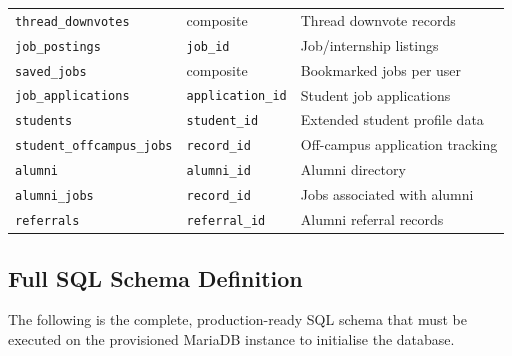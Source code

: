 \documentclass[12pt,a4paper]{article}
\begin{document}
\begin{center}
\begin{tabular}{llp{7cm}}
    \texttt{thread\_downvotes}    & composite               & Thread downvote records \\
    \texttt{job\_postings}        & \texttt{job\_id}         & Job/internship listings \\
    \texttt{saved\_jobs}          & composite               & Bookmarked jobs per user \\
    \texttt{job\_applications}    & \texttt{application\_id} & Student job applications \\
    \texttt{students}             & \texttt{student\_id}     & Extended student profile data \\
    \texttt{student\_offcampus\_jobs} & \texttt{record\_id}  & Off-campus application tracking \\
    \texttt{alumni}               & \texttt{alumni\_id}      & Alumni directory \\
    \texttt{alumni\_jobs}         & \texttt{record\_id}      & Jobs associated with alumni \\
    \texttt{referrals}            & \texttt{referral\_id}    & Alumni referral records \\
    \bottomrule
\end{tabular}
\end{center}

\subsection{Full SQL Schema Definition}

The following is the complete, production-ready SQL schema that must be executed on the provisioned MariaDB instance to initialise the database.
\end{document}
